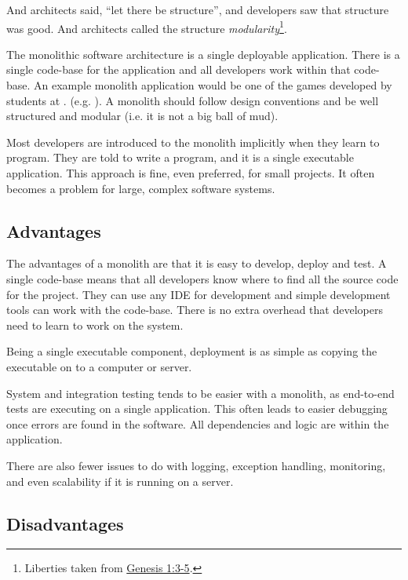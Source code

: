\noindent
And architects said, ``let there be structure'', and developers saw that structure was good.
And architects called the structure \emph{modularity}\footnote{Liberties taken from
\href{https://www.biblegateway.com/passage/?search=gen+1\&version=ESV}{Genesis 1:3-5}.}.

The monolithic software architecture is a single deployable application.
There is a single code-base for the application and all developers work within that code-base.
An example monolith application would be one of the games developed by 
students at .
(e.g. ).
A monolith should follow design conventions and be well structured and modular
(i.e. it is not a big ball of mud).

Most developers are introduced to the monolith implicitly when they learn to program.
They are told to write a program, and it is a single executable application.
This approach is fine, even preferred, for small projects.
It often becomes a problem for large, complex software systems.

\subsection{Advantages}

The advantages of a monolith are that it is easy to develop, deploy and test.
A single code-base means that all developers know where to find all the source code for the project.
They can use any IDE for development and simple development tools can work with the code-base.
There is no extra overhead that developers need to learn to work on the system.

Being a single executable component, deployment is as simple as copying the executable on to a computer or server.

System and integration testing tends to be easier with a monolith, as end-to-end tests are executing on a single application.
This often leads to easier debugging once errors are found in the software.
All dependencies and logic are within the application.

There are also fewer issues to do with logging, exception handling, monitoring, and even scalability if it is running on a server.

\subsection{Disadvantages}

